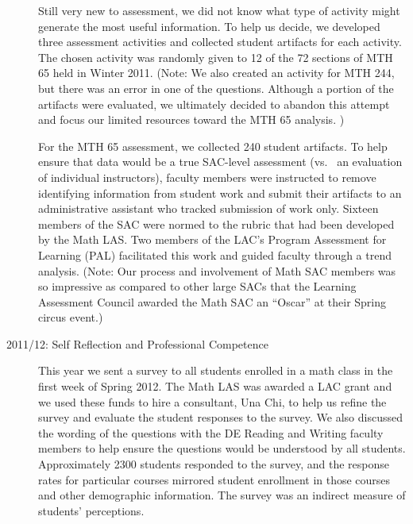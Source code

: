 \begin{description}
		Still very new to assessment, we did not know what type of activity might generate the most useful information.
		To help us decide, we developed three assessment activities and collected student artifacts for each activity.
		The chosen activity was randomly given to 12 of the 72 sections of MTH 65 held in Winter 2011.
		(Note: We also created an activity for MTH 244, but there was an
		error in one of the questions.
		Although a portion of the artifacts were evaluated, we ultimately decided to abandon this attempt and focus our limited resources toward the MTH 65 analysis.
		)

		For the MTH 65 assessment, we collected 240 student artifacts.
		To help ensure that data would be a true SAC-level assessment (vs.
		\ an evaluation of individual
		instructors), faculty members were instructed to remove identifying information
		from student work and submit their artifacts to an administrative assistant who
		tracked submission of work only.
		Sixteen members of the SAC were normed to the rubric that had been developed by the Math LAS.
		Two members of the LAC's Program Assessment for Learning (PAL) facilitated this work and guided faculty through a trend analysis.
		(Note: Our process and involvement of Math SAC
		members was so impressive as compared to other large SACs that the Learning
		Assessment Council awarded the Math SAC an ``Oscar'' at their Spring circus
		event.)

	\item[2011/12: Self Reflection and Professional Competence]

		This year we sent a survey to all students enrolled in a math class in the first week of Spring 2012.
		The Math LAS was awarded a LAC grant and we used these funds to hire a consultant, Una Chi, to help us refine the survey and evaluate the student responses to the survey.
		We also discussed the wording of the questions with the DE Reading and Writing faculty members to help ensure the questions would be understood by all students.
		Approximately 2300 students responded to the survey, and the response rates for particular courses mirrored student enrollment in those courses and other demographic information.
		The survey was an indirect measure of students' perceptions.


\end{description}

